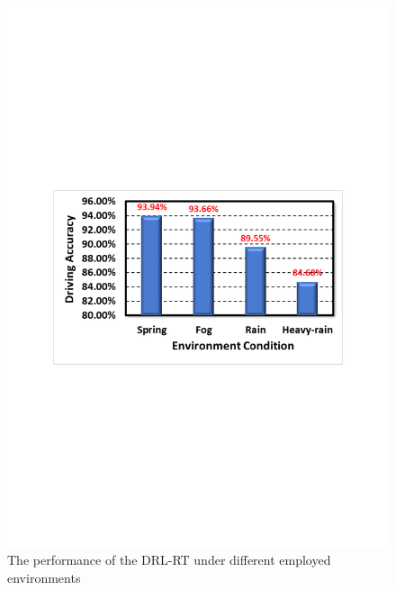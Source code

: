\documentclass{svproc}
\begin{document}
	\begin{figure}[!t]
		\centering
		\includegraphics[scale=.45,trim=3cm 10.3cm 2.7cm 10.3cm,clip]{Main_Results.pdf}
		\caption{The performance of the DRL-RT under different employed environments}
		\label{fig:Main_Results}
	\end{figure}
	
\end{document}
